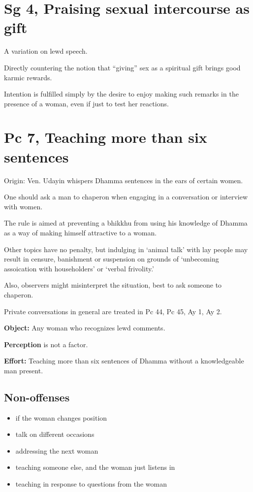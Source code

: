 \section{Sg 4, Praising sexual intercourse as gift}

A variation on lewd speech.

Directly countering the notion that ``giving'' sex as a spiritual gift
brings good karmic rewards.

Intention is fulfilled simply by the desire to enjoy making such remarks
in the presence of a woman, even if just to test her reactions.

\section{Pc 7, Teaching more than six sentences}

\begin{multicols}{2}

Origin: Ven. Udayin whispers Dhamma sentences in the ears of certain
women.

One should ask a man to chaperon when engaging in a conversation or
interview with women.

The rule is aimed at preventing a bhikkhu from using his knowledge of
Dhamma as a way of making himself attractive to a woman.

Other topics have no penalty, but indulging in `animal talk' with lay
people may result in censure, banishment or suspension on grounds of
`unbecoming assoication with householders' or `verbal frivolity.'

Also, observers might misinterpret the situation, best to ask someone to
chaperon.

Private conversations in general are treated in Pc 44, Pc 45, Ay 1, Ay
2.

\columnbreak

\textbf{Object:} Any woman who recognizes lewd comments.

\textbf{Perception} is not a factor.

\textbf{Effort:} Teaching more than six sentences of Dhamma without a
knowledgeable man present.

\subsection{Non-offenses}

\begin{itemize}
\tightlist
\item
  if the woman changes position
\item
  talk on different occasions
\item
  addressing the next woman
\item
  teaching someone else, and the woman just listens in
\item
  teaching in response to questions from the woman
\end{itemize}

\end{multicols}

